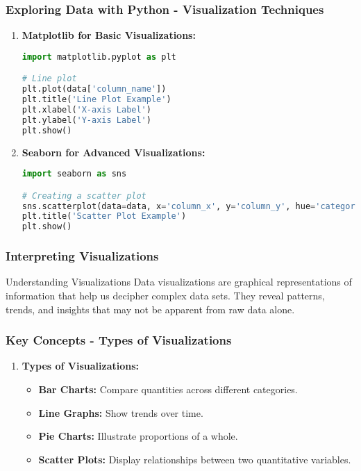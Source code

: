 \documentclass[aspectratio=169]{beamer}
\begin{document}
\begin{frame}[fragile]
    \frametitle{Exploring Data with Python - Visualization Techniques}
    \begin{enumerate}
        \item \textbf{Matplotlib for Basic Visualizations:}
        \begin{lstlisting}[language=Python]
import matplotlib.pyplot as plt

# Line plot
plt.plot(data['column_name'])
plt.title('Line Plot Example')
plt.xlabel('X-axis Label')
plt.ylabel('Y-axis Label')
plt.show()
        \end{lstlisting}

        \item \textbf{Seaborn for Advanced Visualizations:}
        \begin{lstlisting}[language=Python]
import seaborn as sns

# Creating a scatter plot
sns.scatterplot(data=data, x='column_x', y='column_y', hue='category_column')
plt.title('Scatter Plot Example')
plt.show()
        \end{lstlisting}
    \end{enumerate}
\end{frame}

\begin{frame}[fragile]
    \frametitle{Interpreting Visualizations}
    \begin{block}{Understanding Visualizations}
        Data visualizations are graphical representations of information that help us decipher complex data sets. They reveal patterns, trends, and insights that may not be apparent from raw data alone.
    \end{block}
\end{frame}

\begin{frame}[fragile]
    \frametitle{Key Concepts - Types of Visualizations}
    \begin{enumerate}
        \item \textbf{Types of Visualizations:}
        \begin{itemize}
            \item \textbf{Bar Charts:} Compare quantities across different categories.
            \item \textbf{Line Graphs:} Show trends over time.
            \item \textbf{Pie Charts:} Illustrate proportions of a whole.
            \item \textbf{Scatter Plots:} Display relationships between two quantitative variables.
        \end{itemize}
    \end{enumerate}
\end{frame}
\end{document}
